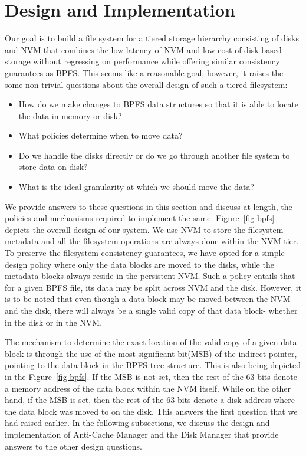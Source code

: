 \section{Design and Implementation}
\label{sec-design}
Our goal is to build a file system for a tiered storage hierarchy consisting of disks and NVM that combines the low latency of NVM and low cost of disk-based storage without regressing on performance while offering similar consistency guarantees as BPFS. This seems like a reasonable goal, however, it raises the some non-trivial questions about the overall design of such a tiered filesystem:

\begin{itemize}
\item How do we make changes to BPFS data structures so that it is able to locate the data in-memory or disk? \vspace{-0.1in}
\item What policies determine when to move data? \vspace{-0.1in}
\item Do we handle the disks directly or do we go through another file system to store data on disk? \vspace{-0.1in}
\item What is the ideal granularity at which we should move the data? \vspace{-0.1in}
\end{itemize}

We provide answers to these questions in this section and discuss at length, the policies and mechanisms required to implement the same. Figure~\ref{fig-bpfs} depicts the overall design of our system. We use NVM to store the filesystem metadata and all the filesystem operations are always done within the NVM tier. To preserve the filesystem consistency guarantees, we have opted for a simple design policy where only the data blocks are moved to the disks, while the metadata blocks always reside in the persistent NVM. Such a policy entails that for a given BPFS file, its data may be split across NVM and the disk. However, it is to be noted that even though a data block may be moved between the NVM and the disk, there will always be a single valid copy of that data block- whether in the disk or in the NVM.

The mechanism to determine the exact location of the valid copy of a given data block is through the use of the most significant bit(MSB) of the indirect pointer, pointing to the data block in the BPFS tree structure. This is also being depicted in the Figure~\ref{fig-bpfs}. If the MSB is not set, then the rest of the 63-bits denote a memory address of the data block within the NVM itself. While on the other hand, if the MSB is set, then the rest of the 63-bits denote a disk address where the data block was moved to on the disk. This answers the first question that we had raised earlier. In the following subsections, we discuss the design and implementation of Anti-Cache Manager and the Disk Manager that provide answers to the other design questions.

